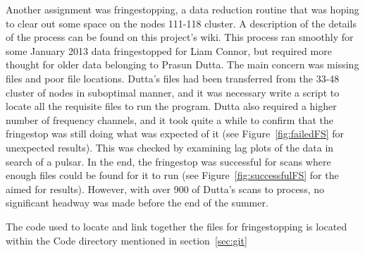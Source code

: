 \documentclass[a4paper,12pt]{article}
\begin{document}
Another assignment was fringestopping, a data reduction routine that was hoping to clear out some space on the nodes 111-118 cluster. A description of the details of the process can be found on this project's wiki. This process ran smoothly for some January 2013 data fringestopped for Liam Connor, but required more thought for older data belonging to Prasun Dutta. The main concern was missing files and poor file locations. Dutta’s files had been transferred from the 33-48 cluster of nodes in suboptimal manner, and it was necessary write a script to locate all the requisite files to run the program. Dutta also required a higher number of frequency channels, and it took quite a while to confirm that the fringestop was still doing what was expected of it (see Figure~\ref{fig:failedFS} for unexpected results). This was checked by examining lag plots of the data in search of a pulsar. In the end, the fringestop was successful for scans where enough files could be found for it to run (see Figure~\ref{fig:successfulFS} for the aimed for results). However, with over 900 of Dutta’s scans to process, no significant headway was made before the end of the summer.

The code used to locate and link together the files for fringestopping is located within the Code directory mentioned in section~\ref{sec:git}
\end{document}
